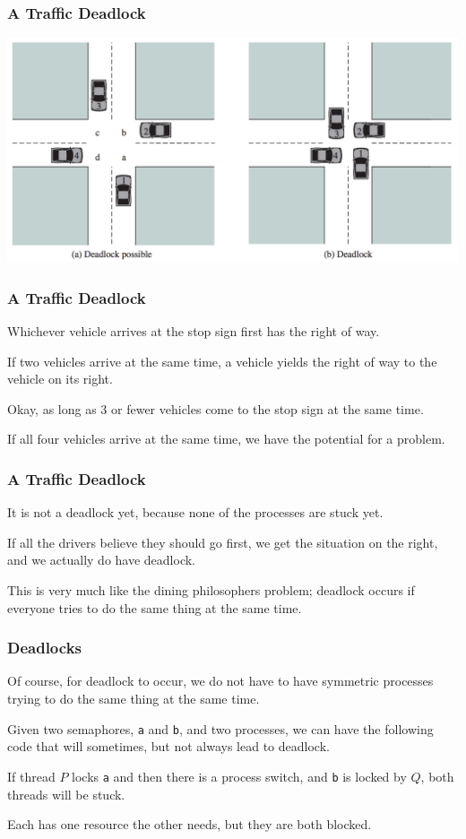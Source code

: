 \begin{frame}
	\frametitle{A Traffic Deadlock}

	\begin{center}
		\includegraphics[width=\textwidth]{images/car-deadlock.png}
	\end{center}


\end{frame}

\begin{frame}
	\frametitle{A Traffic Deadlock}

	Whichever vehicle arrives at the stop sign first has the right of way.

	If two vehicles arrive at the same time, a vehicle yields the right of way to the vehicle on its right.

	Okay, as long as 3 or fewer vehicles come to the stop sign at the same time.

	If all four vehicles arrive at the same time, we have the potential for a problem.
\end{frame}

\begin{frame}
	\frametitle{A Traffic Deadlock}

	It is not a deadlock yet, because none of the processes are stuck yet.

	If all the drivers believe they should go first, we get the situation on the right, and we actually do have deadlock.

	This is very much like the dining philosophers problem; deadlock occurs if everyone tries to do the same thing at the same time.

\end{frame}

\begin{frame}
	\frametitle{Deadlocks}

	Of course, for deadlock to occur, we do not have to have symmetric processes trying to do the same thing at the same time.

	Given two semaphores, \texttt{a} and \texttt{b}, and two processes, we can have the following code that will sometimes, but not always lead to deadlock.

	If thread $P$ locks \texttt{a} and then there is a process switch, and \texttt{b} is locked by $Q$, both threads will be stuck.

	Each has one resource the other needs, but they are both blocked.


\end{frame}

